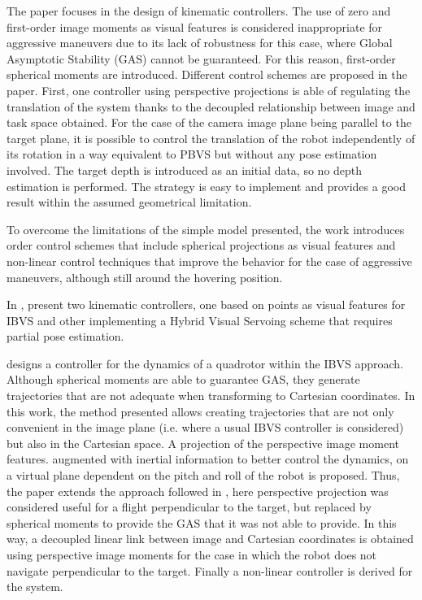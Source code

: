 The paper \cite{bourquardez_2009} focuses in the design of kinematic controllers. The use of zero and first-order image moments as visual features is considered inappropriate for aggressive maneuvers due to its lack of robustness for this case, where Global Asymptotic Stability (GAS) cannot be guaranteed. For this reason, first-order spherical moments are introduced. Different control schemes are proposed in the paper. First, one controller using perspective projections is able of regulating the translation of the system thanks to the decoupled relationship between image and task space obtained. For the case of the camera image plane being parallel to the target plane, it is possible to control the translation of the robot independently of its rotation in a way equivalent to PBVS but without any pose estimation involved. The target depth is introduced as an initial data, so no depth estimation is performed. The strategy is easy to implement and provides a good result within the assumed geometrical limitation.


To overcome the limitations of the simple model presented, the work introduces order control schemes that include spherical projections as visual features and non-linear control techniques that improve the behavior for the case of aggressive maneuvers, although still around the hovering position.
 

 In \cite{ceren_image_2012}, present two kinematic controllers, one based on points as visual features for IBVS and other implementing a Hybrid Visual Servoing scheme that requires partial pose estimation.
  
  
  \cite{jabbari_dynamic_2012} designs a controller for the dynamics of a quadrotor within the IBVS approach. Although spherical moments are able to guarantee GAS, they generate trajectories that are not adequate when transforming to Cartesian coordinates.  In this work, the method presented allows creating trajectories that are not only convenient in the image plane (i.e. where a usual IBVS controller is considered) but also in the Cartesian space. A projection of the perspective image moment features. augmented with inertial information to better control the dynamics, on a virtual plane dependent on the pitch and roll of the robot is proposed. Thus, the paper extends the approach followed in \cite{bourquardez_2009}, here perspective projection was considered useful for a flight perpendicular to the target, but replaced by spherical moments to provide the GAS that it was not able to provide. In this way, a decoupled linear link between image and Cartesian coordinates is obtained using perspective image moments for the case in which the robot does not navigate perpendicular to the target. Finally a non-linear controller is derived for the system.
   
